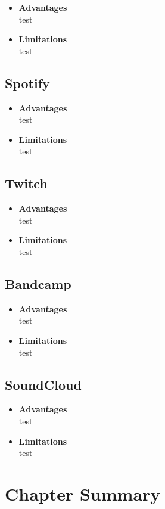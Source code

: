 \begin{itemize}[\label{}]
    \item \textbf{Advantages} \\
    test

    \item \textbf{Limitations} \\
    test
\end{itemize}

\subsection{Spotify}

\begin{itemize}[\label{}]
    \item \textbf{Advantages} \\
    test

    \item \textbf{Limitations} \\
    test
\end{itemize}

\subsection{Twitch}

\begin{itemize}[\label{}]
    \item \textbf{Advantages} \\
    test

    \item \textbf{Limitations} \\
    test
\end{itemize}

\subsection{Bandcamp}

\begin{itemize}[\label{}]
    \item \textbf{Advantages} \\
    test

    \item \textbf{Limitations} \\
    test
\end{itemize}

\subsection{SoundCloud}

\begin{itemize}[\label{}]
    \item \textbf{Advantages} \\
    test

    \item \textbf{Limitations} \\
    test
\end{itemize}

\section{Chapter Summary}